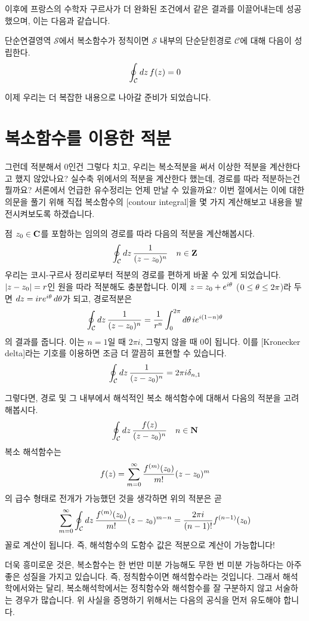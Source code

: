 \documentclass[11pt]{book}
\begin{document}
\begin{MLPar}
이후에 프랑스의 수학자 구르사가 더 완화된 조건에서 같은 결과를 이끌어내는데 성공했으며, 이는 다음과 같습니다.
\end{MLPar}

\begin{MLThm}
단순연결영역 \(\mathcal{S}\)에서 복소함수가 정칙이면 \(\mathcal{S}\) 내부의 단순닫힌경로 \(\mathcal{C}\)에 대해 다음이 성립한다.
\[\oint_{\mathcal{C}} \dd{z} f(z) = 0\]
\end{MLThm}

\begin{MLPar}
이제 우리는 더 복잡한 내용으로 나아갈 준비가 되었습니다.
\end{MLPar}



\section{복소함수를 이용한 적분}
\begin{MLPar}
그런데 적분해서 0인건 그렇다 치고, 우리는 복소적분을 써서 이상한 적분을 계산한다고 했지 않았나요?
실수축 위에서의 적분을 계산한다 했는데, 경로를 따라 적분하는건 뭘까요?
서론에서 언급한 유수정리는 언제 만날 수 있을까요?
이번 절에서는 이에 대한 의문을 풀기 위해 직접 복소함수의 [contour integral]을 몇 가지 계산해보고 내용을 발전시켜보도록 하겠습니다.

\example
점 \(z_0\in\mbox{$\mathbf C$}\)를 포함하는 임의의 경로를 따라 다음의 적분을 계산해봅시다.%
\[\oint_{\mathcal{C}}\dd{z} \frac{1}{(z-z_0)^n} \quad n \in \mbox{$\mathbf Z$}\]
우리는 코시-구르사 정리로부터 적분의 경로를 편하게 바꿀 수 있게 되었습니다.
\(\abs{z-z_0}=r\)인 원을 따라 적분해도 충분합니다.
이제 \(z = z_0 + e^{i\theta}\) (\(0 \le \theta \le 2\pi\))라 두면 \(\dd{z} = ire^{i\theta}\dd{\theta}\)가 되고, 경로적분은
\[\oint_{\mathcal{C}}\dd{z} \frac{1}{(z-z_0)^n} = \frac{1}{r^n}\int_0^{2\pi} \dd{\theta} ie^{i(1-n)\theta}\]
의 결과를 줍니다.
이는 \(n=1\)일 때 \(2\pi i\), 그렇지 않을 때 0이 됩니다.
이를 [Kronecker delta]라는 기호를 이용하면 조금 더 깔끔히 표현할 수 있습니다.
\[\oint_{\mathcal{C}}\dd{z} \frac{1}{(z-z_0)^n} = 2\pi i \delta_{n, 1}\]
\end{MLPar}

\begin{MLPar}
그렇다면, 경로 및 그 내부에서 해석적인 복소 해석함수에 대해서 다음의 적분을 고려해봅시다.
\[\oint_{\mathcal{C}}\dd{z}\frac{f(z)}{(z-z_0)^n} \quad n\in\mbox{$\mathbf N$}\]
복소 해석함수는
\[f(z) = \sum_{m=0}^{\infty}\frac{f^{(m)}(z_0)}{m!}(z-z_0)^m\]
의 급수 형태로 전개가 가능했던 것을 생각하면 위의 적분은 곧
\[\sum_{m=0}^{\infty}\oint_{\mathcal{C}}\dd{z}\frac{f^{(m)}(z_0)}{m!}(z-z_0)^{m-n} = \frac{2\pi i}{(n-1)!}f^{(n-1)}(z_0)\]
꼴로 계산이 됩니다.
즉, 해석함수의 도함수 값은 적분으로 계산이 가능합니다!

더욱 흥미로운 것은, 복소함수는 한 번만 미분 가능해도 무한 번 미분 가능하다는 아주 좋은 성질을 가지고 있습니다.
즉, 정칙함수이면 해석함수라는 것입니다.
그래서 해석학에서와는 달리, 복소해석학에서는 정칙함수와 해석함수를 잘 구분하지 않고 서술하는 경우가 많습니다. 
위 사실을 증명하기 위해서는 다음의 공식을 먼저 유도해야 합니다.
\end{MLPar}
\end{document}
